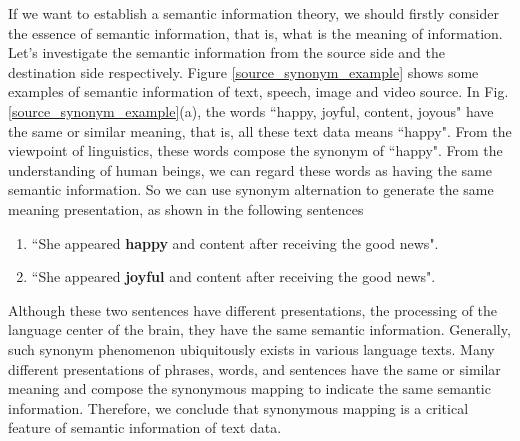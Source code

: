 \documentclass[12pt, draftclsnofoot,onecolumn]{IEEEtran}
\begin{document}
If we want to establish a semantic information theory, we should firstly consider the essence of semantic information, that is, what is the meaning of information. Let's investigate the semantic information from the source side and the destination side respectively. Figure \ref{source_synonym_example} shows some examples of semantic information of text, speech, image and video source. In Fig. \ref{source_synonym_example}(a), the words ``happy, joyful, content, joyous" have the same or similar meaning, that is, all these text data means ``happy". From the viewpoint of linguistics, these words compose the synonym of ``happy". From the understanding of human beings, we can regard these words as having the same semantic information. So we can use synonym alternation to generate the same meaning presentation, as shown in the following sentences
\begin{enumerate}[]
  \item  ``She appeared \textbf{happy} and content after receiving the good news".
  \item  ``She appeared \textbf{joyful} and content after receiving the good news".
\end{enumerate}
Although these two sentences have different presentations, the processing of the language center of the brain, they have the same semantic information. Generally, such synonym phenomenon ubiquitously exists in various language texts. Many different presentations of phrases, words, and sentences have the same or similar meaning and compose the synonymous mapping to indicate the same semantic information. Therefore, we conclude that synonymous mapping is a critical feature of semantic information of text data.
\end{document}
